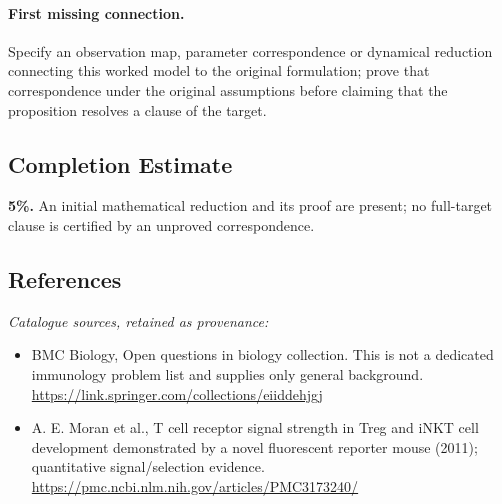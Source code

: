 \documentclass[11pt]{article}
\begin{document}
\paragraph{First missing connection.} Specify an observation map, parameter correspondence or dynamical reduction connecting this worked model to the original formulation; prove that correspondence under the original assumptions before claiming that the proposition resolves a clause of the target.
\subsection{Completion Estimate}
\textbf{5\%.} An initial mathematical reduction and its proof are present; no full-target clause is certified by an unproved correspondence.
\subsection{References}
\noindent\emph{Catalogue sources, retained as provenance:}
\begin{itemize}
\item BMC Biology, Open questions in biology collection. This is not a dedicated immunology problem list and supplies only general background. \url{https://link.springer.com/collections/eiiddehjgj}
\item A. E. Moran et al., T cell receptor signal strength in Treg and iNKT cell development demonstrated by a novel fluorescent reporter mouse (2011); quantitative signal/selection evidence. \url{https://pmc.ncbi.nlm.nih.gov/articles/PMC3173240/}
\end{itemize}
\end{document}
